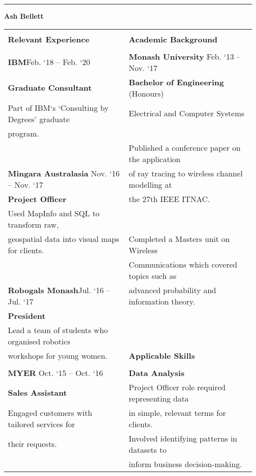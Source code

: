 \documentclass{letter}
\begin{document}
	\centering
	\rule[4pt]{\textwidth}{4pt}
	\LARGE
	\textbf{Ash Bellett}\\
	\large
	\begin{center}
	\begin{tabularx}{\textwidth}{X | X}
	\hline
	 & \\
	\Large \textbf{Relevant Experience} & \Large \textbf{Academic Background}\\
	 & \\
	\large \textbf{IBM}\hfill Feb. `18 -- Feb. `20 & \textbf{Monash University} \hfill Feb. `13 -- Nov. `17\\
	\textbf{Graduate Consultant} & \textbf{Bachelor of Engineering} (Honours)\\
	Part of IBM`s `Consulting by Degrees' graduate & Electrical and Computer Systems\\
	program. & \\
	 & Published a conference paper on the application\\
	\textbf{Mingara Australasia} \hfill Nov. `16 -- Nov. `17 & of ray tracing to wireless channel modelling at\\
	\textbf{Project Officer} & the 27th IEEE ITNAC.\\
	Used MapInfo and SQL to transform raw, & \\
	geospatial data into visual maps for clients. & Completed a Masters unit on Wireless\\
	 & Communications which covered topics such as\\
	\textbf{Robogals Monash}\hfill Jul. `16 -- Jul. `17 & advanced probability and information theory.\\
	\textbf{President} & \\
	\cline{2-2}
	Lead a team of students who organised robotics & \\
	workshops for young women. & \Large \textbf{Applicable Skills}\\
	 & \\
	\textbf{MYER} \hfill Oct. `15 -- Oct. `16 & \textbf{Data Analysis}\\
	\textbf{Sales Assistant} & Project Officer role required representing data\\
	Engaged customers with tailored services for & in simple, relevant terms for clients.\\
	their requests. & Involved identifying patterns in datasets to\\
	 & inform business decision-making.\\
	 \cline{1-1}

\end{tabularx}
\end{center}
\end{document}
